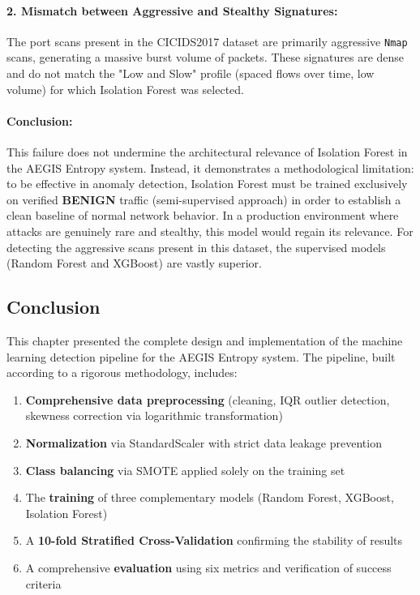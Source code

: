 \paragraph{2. Mismatch between Aggressive and Stealthy Signatures:} The port scans present in the CICIDS2017 dataset are primarily aggressive \texttt{Nmap} scans, generating a massive burst volume of packets. These signatures are dense and do not match the "Low and Slow" profile (spaced flows over time, low volume) for which Isolation Forest was selected.

\paragraph{Conclusion:} This failure does not undermine the architectural relevance of Isolation Forest in the AEGIS Entropy system. Instead, it demonstrates a methodological limitation: to be effective in anomaly detection, Isolation Forest must be trained exclusively on verified \textbf{BENIGN} traffic (semi-supervised approach) in order to establish a clean baseline of normal network behavior. In a production environment where attacks are genuinely rare and stealthy, this model would regain its relevance. For detecting the aggressive scans present in this dataset, the supervised models (Random Forest and XGBoost) are vastly superior.

\subsection{Conclusion}

This chapter presented the complete design and implementation of the machine learning detection pipeline for the AEGIS Entropy system. The pipeline, built according to a rigorous methodology, includes:

\begin{enumerate}
    \item \textbf{Comprehensive data preprocessing} (cleaning, IQR outlier detection, skewness correction via logarithmic transformation)
    \item \textbf{Normalization} via StandardScaler with strict data leakage prevention
    \item \textbf{Class balancing} via SMOTE applied solely on the training set
    \item The \textbf{training} of three complementary models (Random Forest, XGBoost, Isolation Forest)
    \item A \textbf{10-fold Stratified Cross-Validation} confirming the stability of results
    \item A comprehensive \textbf{evaluation} using six metrics and verification of success criteria
\end{enumerate}

